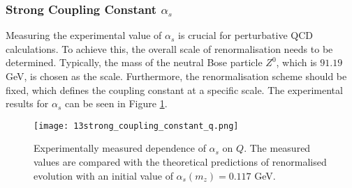 \subsubsection{Strong Coupling Constant $\alpha_s$}
\label{10.13::strong_coupling_constant}
    Measuring the experimental value of $\alpha_s$ is crucial for perturbative QCD calculations.
    To achieve this, the overall scale of renormalisation needs to be determined.
    Typically, the mass of the neutral Bose particle $Z^0$, which is $91.19$ GeV, is chosen as the scale.
    Furthermore, the renormalisation scheme should be fixed, which defines the coupling constant at a specific scale.
    The experimental results for $\alpha_s$ can be seen in Figure \ref{fig::10.13::alpha_q_dependence}.

    \begin{figure}[t!]
        \texttt{[image: 13strong\_coupling\_constant\_q.png]}
        \caption[$\alpha_s$ dependence on $Q^2$.]
        {Experimentally measured dependence of $\alpha_s$ on $Q$.
        The measured values are compared with the theoretical predictions of renormalised evolution with an initial value of $\alpha_s(m_z) = 0.117$ GeV.}
        \label{fig::10.13::alpha_q_dependence}
    \end{figure}
